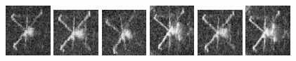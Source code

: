 \begin{figure}
    \includegraphics[width=0.15\textwidth]{chapters/images/dataset/all-class-images/valve/valve-114.jpg}
    \includegraphics[width=0.15\textwidth]{chapters/images/dataset/all-class-images/valve/valve-183.jpg}
    \includegraphics[width=0.15\textwidth]{chapters/images/dataset/all-class-images/valve/valve-203.jpg}
    \includegraphics[width=0.15\textwidth]{chapters/images/dataset/all-class-images/valve/valve-65.jpg}
    \includegraphics[width=0.15\textwidth]{chapters/images/dataset/all-class-images/valve/valve-184.jpg}
    \includegraphics[width=0.15\textwidth]{chapters/images/dataset/all-class-images/valve/valve-69.jpg}
    

\end{figure}
